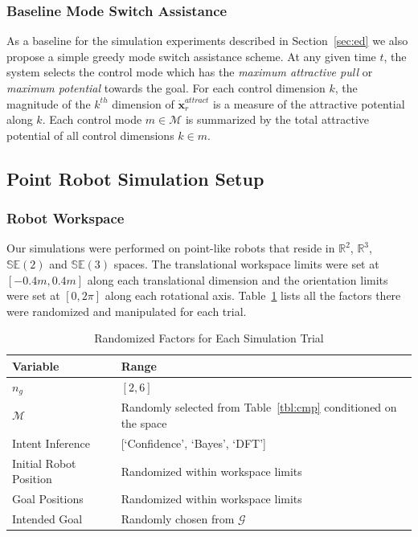 \documentclass[conference]{IEEEtran}
\begin{document}
\subsubsection{Baseline Mode Switch Assistance}\label{sssec:baseline}
As a baseline for the simulation experiments described in Section~\ref{sec:ed} we also propose a simple greedy mode switch assistance scheme. At any given time $t$, the system selects the control mode which has the \textit{maximum attractive pull} or \textit{maximum potential} towards the goal. For each control dimension $k$, the magnitude of the $k^{th}$ dimension of $\dot{\boldsymbol{x}}_r^{attract}$ is a measure of the attractive potential along $k$. Each control mode $m \in \mathcal{M}$ is summarized by the total attractive potential of all control dimensions $k \in m$.

\subsection{Point Robot Simulation Setup}
\subsubsection{Robot Workspace}
Our simulations were performed on point-like robots that reside in $\mathbb{R}^2$, $\mathbb{R}^3$, $\mathbb{SE}(2)$ and $\mathbb{SE}(3)$ spaces. The translational workspace limits were set at $[-0.4m, 0.4m]$ along each translational dimension and the orientation limits were set at $[0, 2\pi]$ along each rotational axis. Table~\ref{tbl:manip} lists all the factors there were randomized and manipulated for each trial. 
\begin{table}[t]
	\centering
	\begin{tabular}{|p{3cm}|p{3cm}|}
		\hline
		\textbf{Variable} &\textbf{Range}  \\ \hline
		$n_g$ &  $[2,6]$ \\ \hline
		$\mathcal{M}$ & Randomly selected from Table~\ref{tbl:cmp} conditioned on the space\\ \hline
		Intent Inference & [`Confidence', `Bayes', `DFT'] \\ \hline
		Initial Robot Position & Randomized within workspace limits \\ \hline
		Goal Positions & Randomized within workspace limits \\ \hline
		Intended Goal & Randomly chosen from $\mathcal{G}$ \\ \hline
	\end{tabular}
	\vspace{.2cm}
	\caption{Randomized Factors for Each Simulation Trial} 
	\label{tbl:manip}
	\vspace{-.5cm}
\end{table}
\end{document}
